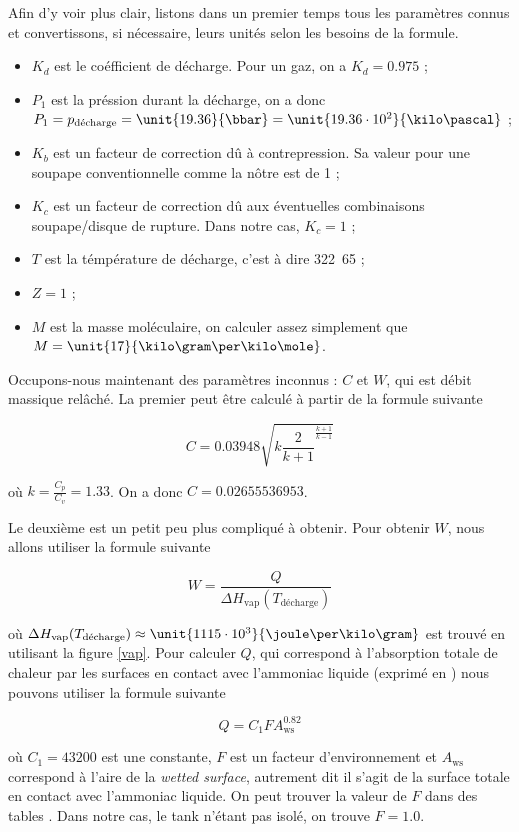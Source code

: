 Afin d'y voir plus clair, listons dans un premier temps 
tous les paramètres connus et convertissons, si nécessaire,
leurs unités selon les besoins de la formule.

\begin{itemize}
	\item $K_d$ est le coéfficient de décharge. Pour un gaz,
	on a $K_d = 0.975$ ;
	\item $P_1$ est la préssion durant la décharge, on a donc
	$P_1 = p_{\text{décharge}} = \unit{19.36}{\bbar} = 
	\unit{19.36\cdot10^2}{\kilo\pascal}$ ;
	\item $K_b$ est un facteur de correction dû à contrepression. 
	Sa valeur pour une soupape conventionnelle comme la nôtre est de 1 ;
	\item $K_c$ est un facteur de correction dû aux éventuelles
	combinaisons soupape/disque de rupture. Dans notre cas, $K_c = 1$ ;
	\item $T$ est la témpérature de décharge, c'est à dire 
	\unit{322.65}{\kelvin} ;
	\item $Z = 1$ ;
	\item $M$ est la masse moléculaire, on calculer assez 
	simplement que $M = \unit{17}{\kilo\gram\per\kilo\mole}$.
\end{itemize}

Occupons-nous maintenant des paramètres inconnus : $C$ et $W$,
qui est débit massique relâché.
La premier peut être calculé à partir de la formule suivante\cite{mignon}

$$C = 0.03948\sqrt{k\frac{2}{k+1}^{\frac{k+1}{k-1}}}$$

où $k = \frac{C_p}{C_v} = 1.33$. On a donc $C = 0.02655536953$.

Le deuxième est un petit peu plus compliqué à obtenir. Pour obtenir
$W$, nous allons utiliser la formule suivante\cite{mignon}

$$W = \frac{Q}{\Delta H_{\text{vap}}(T_{\text{décharge}})}$$ 

où $\Delta H_{\text{vap}}(T_{\text{décharge}}) \approx 
\unit{1115\cdot10^3}{\joule\per\kilo\gram}$ est trouvé en utilisant
la figure \ref{vap}. Pour calculer $Q$, qui correspond à
l'absorption totale de chaleur par les surfaces en contact avec
l'ammoniac liquide (exprimé en \unit{}{\watt}) nous pouvons
utiliser la formule suivante\cite{mignon}

$$Q = C_1FA_{\text{ws}}^{0.82}$$

où $C_1 = 43200$ est une constante, $F$ est un 
facteur d'environnement et $A_{\text{ws}}$ correspond
à l'aire de la \textit{wetted surface}, autrement dit
il s'agit de la surface totale en contact avec l'ammoniac
liquide. On peut trouver la valeur de $F$ dans des tables
\cite{mignon}. Dans notre cas, le tank n'étant pas isolé,
on trouve $F = 1.0$.

